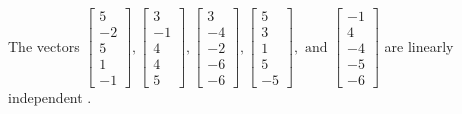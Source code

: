 \begin{exercise}
\begin{exerciseStatement}
  \end{exerciseStatement}
  \begin{exerciseAnswer}
   The vectors \(\left[\begin{array}{r}
5 \\
-2 \\
5 \\
1 \\
-1
\end{array}\right] , \left[\begin{array}{r}
3 \\
-1 \\
4 \\
4 \\
5
\end{array}\right] , \left[\begin{array}{r}
3 \\
-4 \\
-2 \\
-6 \\
-6
\end{array}\right] , \left[\begin{array}{r}
5 \\
3 \\
1 \\
5 \\
-5
\end{array}\right] , \text{ and } \left[\begin{array}{r}
-1 \\
4 \\
-4 \\
-5 \\
-6
\end{array}\right]\) are 
  	 linearly independent  .
  


  \end{exerciseAnswer}
\end{exercise}